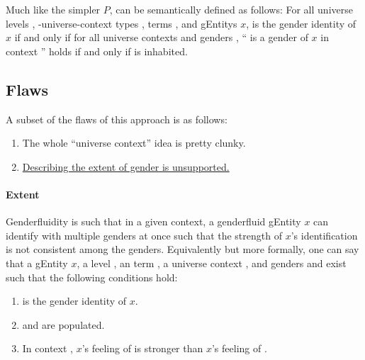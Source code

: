 \documentclass{article}
\theoremstyle{remark}
\begin{document}
Much like the simpler \(P\),  can be semantically defined as follows: For all universe levels , -universe-context types ,   terms , and \glspl{gEntity} \(x\),  is the gender identity of \(x\) if and only if for all universe contexts  and genders , `` is a gender of \(x\) in context '' holds if and only if    is inhabited.

\subsection{Flaws}
A subset of the flaws of this approach is as follows:

\begin{enumerate}
  \item The whole ``universe context'' idea is pretty clunky.\label{enum:gender4flawsClunky}
  \item \hyperref[sec:gender4Extent]{Describing the extent of gender is unsupported.}\label{enum:gender4flawsExtent}
\end{enumerate}

\paragraph{Extent}\label{sec:gender4Extent}
Genderfluidity is such that in a given context, a genderfluid \gls{gEntity} \(x\) can identify with multiple genders at once such that the strength of \(x\)'s identification is not consistent among the genders.  Equivalently but more formally, one can say that a \gls{gEntity} \(x\), a level , an   term , a universe context , and genders  and  exist such that the following conditions hold:

\begin{enumerate}
  \item {} is the gender identity of \(x\).
  \item {}   and    are populated.
  \item In context , \(x\)'s feeling of  is stronger than \(x\)'s feeling of .
\end{enumerate}
\end{document}
